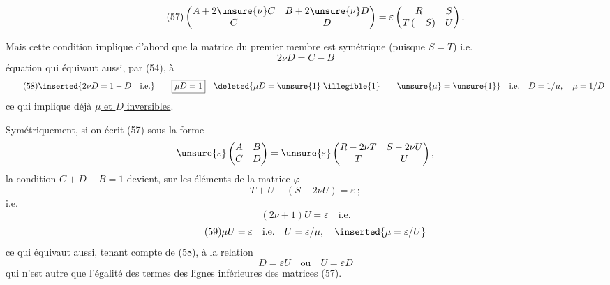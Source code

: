 \[
\tag{57}
\begin{pmatrix}
 A+2\unsure{\nu}C&B+2\unsure{\nu}D\\
 C&D
\end{pmatrix}
=\varepsilon\begin{pmatrix}R&S\\T\,(=S)&U\end{pmatrix}.
\]

Mais cette condition implique d'abord que la matrice du premier membre est symétrique (puisque $S=T$) i.e.
\[
2\nu D=C-B
\]
équation qui équivaut aussi, par (54), à
\[
\tag{58}
\inserted{2\nu D=1-D\quad\text{i.e.}}\qquad
\boxed{\mu D=1}\quad
\deleted{\mu D=\unsure{1}\;\illegible{1}\qquad\unsure{\mu}=\unsure{1}}\quad
\text{i.e.}\quad D=1/\mu,\quad\mu=1/D
\]
ce qui implique déjà \uline{$\mu$ et $D$ inversibles}.

Symétriquement, si on écrit (57) sous la forme
\[
\unsure{\varepsilon}\begin{pmatrix}A&B\\C&D\end{pmatrix}
=\unsure{\varepsilon}\begin{pmatrix}R-2\nu T&S-2\nu U\\T&U\end{pmatrix},
\]
la condition $C+D-B=1$ devient, sur les éléments de la matrice $\varphi$
\[
T+U-(S-2\nu U)=\varepsilon\ ;
\]
i.e.
\[
(2\nu+1)U=\varepsilon\quad\text{i.e.}
\]
\[
\tag{59}
\mu U=\varepsilon\quad\text{i.e.}\quad U=\varepsilon/\mu,
\quad\inserted{\mu=\varepsilon/U}
\]
ce qui équivaut aussi, tenant compte de (58), à la relation
\[
\tag{60}
D=\varepsilon U\quad\text{ou}\quad U=\varepsilon D
\]
qui n'est autre que l'égalité des termes des lignes inférieures des matrices (57).

